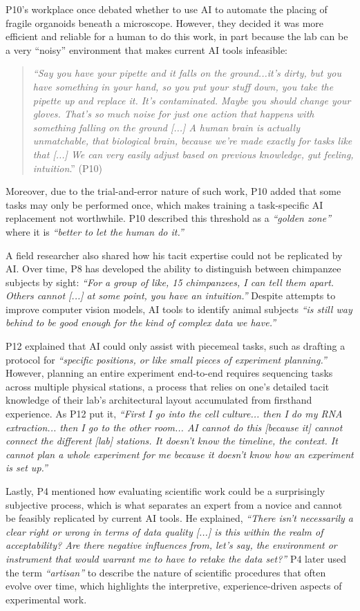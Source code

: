 P10's workplace once debated whether to use AI to automate the placing of fragile organoids beneath a microscope. However, they decided it was more efficient and reliable for a human to do this work, in part because the lab can be a very ``noisy'' environment that makes current AI tools infeasible:

\begin{quote}\textit{``Say you have your pipette and it falls on the ground...it's dirty, but you have something in your hand, so you put your stuff down, you take the pipette up and replace it. It's contaminated. Maybe you should change your gloves. That's so much noise for just one action that happens with something falling on the ground [...] A human brain is actually unmatchable, that biological brain, because we're made exactly for tasks like that [...] We can very easily adjust based on previous knowledge, gut feeling, intuition}.'' (P10)\end{quote}

Moreover, due to the trial-and-error nature of such work, P10 added that some tasks may only be performed once, which makes training a task-specific AI replacement not worthwhile. P10 described this threshold as a \textit{``golden zone''} where it is \textit{``better to let the human do it.''}

A field researcher also shared how his tacit expertise could not be replicated by AI. Over time, P8 has developed the ability to distinguish between chimpanzee subjects by sight: \textit{``For a group of like, 15 chimpanzees, I can tell them apart. Others cannot [...] at some point, you have an intuition.''} Despite attempts to improve computer vision models, AI tools to identify animal subjects \textit{``is still way behind to be good enough for the kind of complex data we have.''}

P12 explained that AI could only assist with piecemeal tasks, such as drafting a protocol for \textit{``specific positions, or like small pieces of experiment planning.''} However, planning an entire experiment end-to-end requires sequencing tasks across multiple physical stations, a process that relies on one's detailed tacit knowledge of their lab's architectural layout accumulated from firsthand experience. As P12 put it, \textit{“First I go into the cell culture... then I do my RNA extraction... then I go to the other room... AI cannot do this [because it] cannot connect the different [lab] stations. It doesn't know the timeline, the context. It cannot plan a whole experiment for me because it doesn't know how an experiment is set up.''}

Lastly, P4 mentioned how evaluating scientific work could be a surprisingly subjective process, which is what separates an expert from a novice and cannot be feasibly replicated by current AI tools. He explained, \textit{``There isn't necessarily a clear right or wrong in terms of data quality [...] is this within the realm of acceptability? Are there negative influences from, let's say, the environment or instrument that would warrant me to have to retake the data set?''} P4 later used the term \textit{``artisan''} to describe the nature of scientific procedures that often evolve over time, which highlights the interpretive, experience-driven aspects of experimental work.